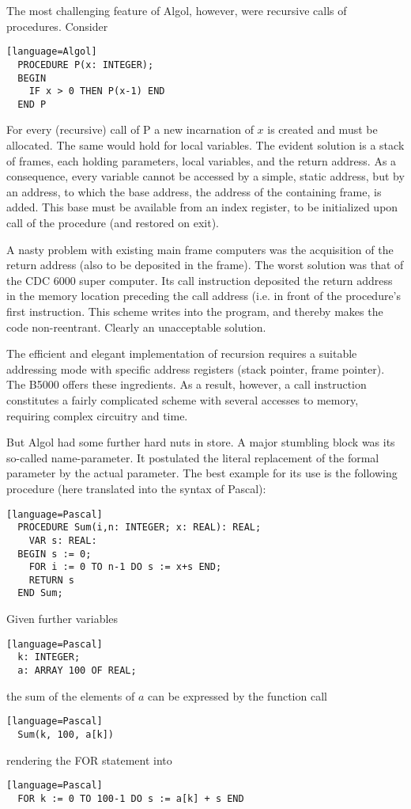 The most challenging feature of Algol, however, were recursive calls of
procedures. Consider
\begin{verbatim}[language=Algol]
  PROCEDURE P(x: INTEGER);
  BEGIN
    IF x > 0 THEN P(x-1) END
  END P
\end{verbatim}

For every (recursive) call of P a new incarnation of $x$ is created and must be
allocated. The same would hold for local variables. The evident solution is a stack
of frames, each holding parameters, local variables, and the return address. As a
consequence, every variable cannot be accessed by a simple, static address, but
by an address, to which the base address, the address of the containing frame, is
added. This base must be available from an index register, to be initialized upon
call of the procedure (and restored on exit).

A nasty problem with existing main frame computers was the acquisition of the
return address (also to be deposited in the frame). The worst solution was that of
the CDC 6000 super computer. Its call instruction deposited the return address in
the memory location preceding the call address (i.e. in front of the procedure's first
instruction. This scheme writes into the program, and thereby makes the code
non-reentrant. Clearly an unacceptable solution.

The efficient and elegant implementation of recursion requires a suitable
addressing mode with specific address registers (stack pointer, frame pointer). The
B5000 offers these ingredients. As a result, however, a call instruction constitutes
a fairly complicated scheme with several accesses to memory, requiring complex
circuitry and time.

But Algol had some further hard nuts in store. A major stumbling block was its
so-called name-parameter. It postulated the literal replacement of the formal
parameter by the actual parameter. The best example for its use is the following
procedure (here translated into the syntax of Pascal):
\begin{verbatim}[language=Pascal]
  PROCEDURE Sum(i,n: INTEGER; x: REAL): REAL;
    VAR s: REAL:
  BEGIN s := 0;
    FOR i := 0 TO n-1 DO s := x+s END;
    RETURN s
  END Sum;
\end{verbatim}
Given further variables
\begin{verbatim}[language=Pascal]
  k: INTEGER;
  a: ARRAY 100 OF REAL;
\end{verbatim}
the sum of the elements of $a$ can be expressed by the function call
\begin{verbatim}[language=Pascal]
  Sum(k, 100, a[k])
\end{verbatim}
rendering the FOR statement into
\begin{verbatim}[language=Pascal]
  FOR k := 0 TO 100-1 DO s := a[k] + s END
\end{verbatim}

